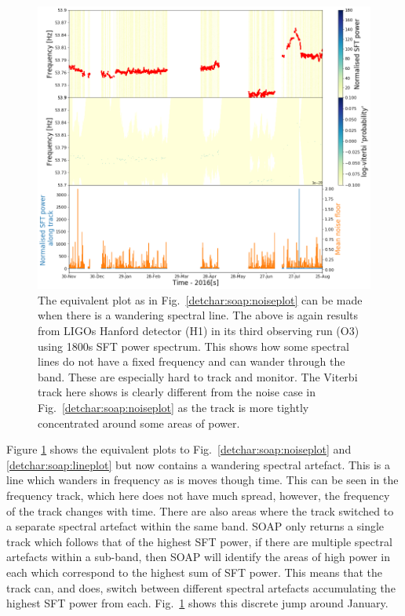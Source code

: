 %
\begin{figure}[hpt]
	\centering
	\includegraphics[width=\textwidth]{C6_detchar/track_F53_7_53_9_wander.png}
	\caption[Example SOAP output for wandering line.]{The equivalent plot as in Fig.~\ref{detchar:soap:noiseplot} can be made when there is a wandering spectral line. The above is again results from \glspl{LIGO} Hanford detector (H1) in its third observing run (O3) using 1800s \gls{SFT} power spectrum. This shows how some spectral lines do not have a fixed frequency and can wander through the band. These are especially hard to track and monitor. The Viterbi track here shows is clearly different from the noise case in Fig.~\ref{detchar:soap:noiseplot} as the track is more tightly concentrated around some areas of power. }
	\label{detchar:soap:wanderplot}
\end{figure}
%

Figure \ref{detchar:soap:wanderplot} shows the equivalent plots to
Fig.~\ref{detchar:soap:noiseplot} and \ref{detchar:soap:lineplot} but now
contains a wandering spectral artefact.  This is
a line which wanders in
frequency as is moves though time.  This can be seen in the frequency
track, which here does not have much spread, however, the frequency of the
track changes with time.  There are also areas where the track switched to a separate spectral artefact within the same
band.  SOAP only returns a single track which follows that of the highest \gls{SFT} power, if there are multiple spectral artefacts within a sub-band, then SOAP will identify the areas of high power in each which correspond to the highest sum of \gls{SFT} power.
This means that the track can, and does, switch between different spectral artefacts accumulating the highest \gls{SFT} power from each.
Fig.~\ref{detchar:soap:wanderplot} shows this discrete jump around
January.

